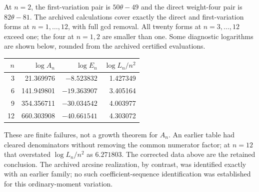 At $n=2$, the first-variation pair is $50\theta-49$ and the direct
weight-four pair is $82\theta-81$. The archived calculations cover
exactly the direct and first-variation forms at $n=1,\ldots,12$,
with full gcd removal. All twenty forms at $n=3,\ldots,12$ exceed one;
the four at $n=1,2$ are smaller than one. Some diagnostic logarithms are
shown below, rounded from the archived certified evaluations.
\begin{center}
\begin{tabular}{rrrr}
\toprule
$n$&$\log A_n$&$\log E_n$&$\log L_n/n^2$\\\midrule
3&21.369976&$-8.523832$&1.427349\\
6&141.949801&$-19.363907$&3.405164\\
9&354.356711&$-30.034542$&4.003977\\
12&660.303908&$-40.661541$&4.303072\\\bottomrule
\end{tabular}
\end{center}
These are finite failures, not a growth theorem for $A_n$. An earlier
table had cleared denominators without removing the common numerator
factor; at $n=12$ that overstated $\log L_n/n^2$ as $6.271803$.
The corrected data above are the retained conclusion. The archived
arcsine realization, by contrast, was identified exactly with an earlier
family; no such coefficient-sequence identification was established
for this ordinary-moment variation.
